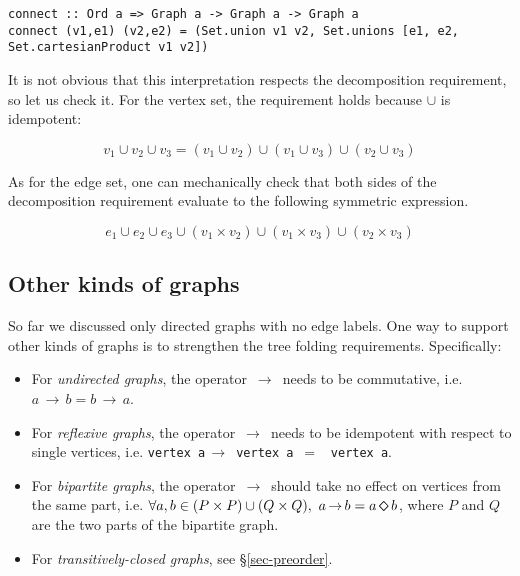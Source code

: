\documentclass[english,submission]{programming}
\newcommand{\hcode}[1]{{\color{darkblue} \lstinline[keywordstyle={}]|#1|}} %
\newcommand{\dia}{\,\text{\raisebox{-0.3mm}{\Large $\diamond$}}\,}
\newcommand{\arr}{\,\text{$\rightarrow$}\,}
\begin{document}
\begin{lstlisting}
connect :: Ord a => Graph a -> Graph a -> Graph a
connect (v1,e1) (v2,e2) = (Set.union v1 v2, Set.unions [e1, e2, Set.cartesianProduct v1 v2])
\end{lstlisting}

\noindent
It is not obvious that this interpretation respects the decomposition
requirement, so let us check it. For the vertex set, the requirement holds
because $\cup$ is idempotent:

\vspace{-5mm}
\begin{equation*}
v_1 \cup v_2 \cup v_3 = (v_1 \cup v_2) \cup (v_1 \cup v_3) \cup (v_2 \cup v_3)
\end{equation*}
\vspace{-5mm}

\noindent
As for the edge set, one can mechanically check that both sides of the
decomposition requirement evaluate to the following symmetric expression.

\vspace{-5mm}
\begin{equation*}
e_1 \cup e_2 \cup e_3 \cup (v_1 \times v_2) \cup (v_1 \times v_3) \cup (v_2 \times v_3)
\end{equation*}
\vspace{-5mm}

\subsection{Other kinds of graphs}

So far we discussed only directed graphs with no edge labels. One way to support
other kinds of graphs is to strengthen the tree folding requirements.
Specifically:

\begin{itemize}
    \item For \emph{undirected graphs}, the operator $\arr$ needs to be
    commutative, i.e. $a \arr b = b \arr a$.
    \item For \emph{reflexive graphs}, the operator $\arr$ needs to be
    idempotent with respect to single vertices, i.e.
    \hcode{vertex a}$\arr$\hcode{vertex a}~$=$~\hcode{vertex a}.
    \item For \emph{bipartite graphs}, the operator $\arr$ should take no
    effect on vertices from the same part, i.e.
    $\forall a,b \in (P \times P) \cup (Q \times Q),\ a \arr b = a \dia b$,
    where $P$ and $Q$ are the two parts of the bipartite graph.
    \item For \emph{transitively-closed graphs}, see \S\ref{sec-preorder}.
\end{itemize}
\end{document}
